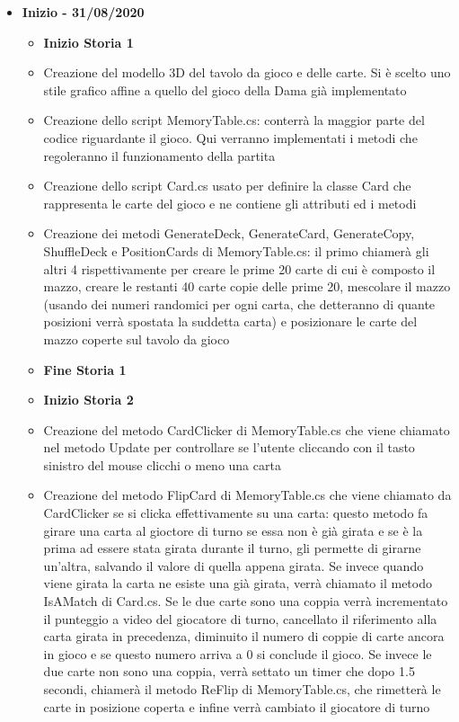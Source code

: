 \documentclass[12pt]{article}
\begin{document}
\begin{itemize}
\item \textbf{Inizio - 31/08/2020}
	\begin{itemize}
	\item \textbf{Inizio Storia 1}
	\item Creazione del modello 3D del tavolo da gioco e delle carte. Si è scelto uno stile grafico affine a quello del gioco della Dama già implementato
	\item Creazione dello script MemoryTable.cs: conterrà la maggior parte del codice riguardante il gioco. Qui verranno implementati i metodi che regoleranno il funzionamento della partita
	\item Creazione dello script Card.cs usato per definire la classe Card che rappresenta le carte del gioco e ne contiene gli attributi ed i metodi
	\item Creazione dei metodi GenerateDeck, GenerateCard, GenerateCopy, ShuffleDeck e PositionCards di MemoryTable.cs: il primo chiamerà gli altri 4 rispettivamente per creare le prime 20 carte di cui è composto il mazzo, creare le restanti 40 carte copie delle prime 20, mescolare il mazzo (usando dei numeri randomici per ogni carta, che detteranno di quante posizioni verrà spostata la suddetta carta) e posizionare le carte del mazzo coperte sul tavolo da gioco
	\item \textbf{Fine Storia 1}
	\item \textbf{Inizio Storia 2}
	\item Creazione del metodo CardClicker di MemoryTable.cs che viene chiamato nel metodo Update per controllare se l'utente cliccando con il tasto sinistro del mouse clicchi o meno una carta
	\item Creazione del metodo FlipCard di MemoryTable.cs che viene chiamato da CardClicker se si clicka effettivamente su una carta: questo metodo fa girare una carta al gioctore di turno se essa non è già girata e se è la prima ad essere stata girata durante il turno, gli permette di girarne un'altra, salvando il valore di quella appena girata. Se invece quando viene girata la carta ne esiste una già girata, verrà chiamato il metodo IsAMatch di Card.cs. Se le due carte sono una coppia verrà incrementato il punteggio a video del giocatore di turno, cancellato il riferimento alla carta girata in precedenza, diminuito il numero di coppie di carte ancora in gioco e se questo numero arriva a 0 si conclude il gioco. Se invece le due carte non sono una coppia, verrà settato un timer che dopo 1.5 secondi, chiamerà il metodo ReFlip di MemoryTable.cs, che rimetterà le carte in posizione coperta e infine verrà cambiato il giocatore di turno

\end{itemize}
\end{itemize}
\end{document}
